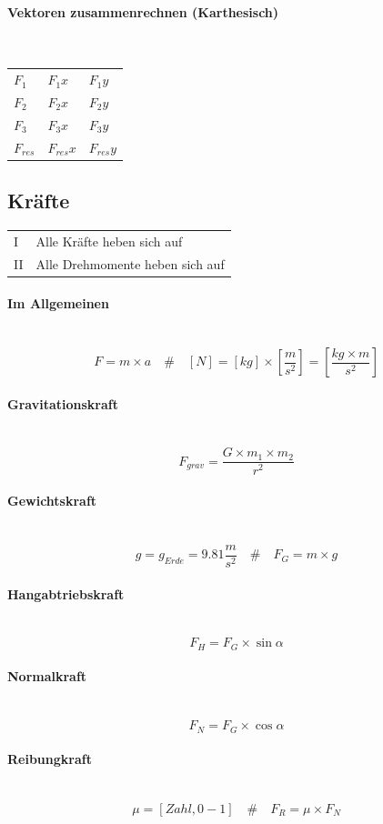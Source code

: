\documentclass[a4paper,10pt]{article}
\newcommand{\lbparagraph}[1]{\paragraph{#1}\mbox{}\\}
\newcommand{\eqsp}[1]{\quad\#\quad}
\begin{document}
\lbparagraph{Vektoren zusammenrechnen (Karthesisch)}

\begin{tabular}{l|l|l}		
  $F_1$ & $F_1x$ & $F_1y$ \\			
  $F_2$ & $F_2x$ & $F_2y$ \\			
  $F_3$ & $F_3x$ & $F_3y$ \\
  \hline
  $F_{res}$ & $F_{res}x$ & $F_{res}y$ \\
\end{tabular}

\subsection{Kräfte}

\begin{tabular}{l|l}
    I & Alle Kräfte heben sich auf \\
    II & Alle Drehmomente heben sich auf
\end{tabular}

\lbparagraph{Im Allgemeinen}

\begin{equation}
    F = m \times a
    \eqsp{}
    [N] = [kg] \times [\frac{m}{s^2}] = [\frac{kg \times m}{s^2}]
\end{equation}

\lbparagraph{Gravitationskraft}

\begin{equation}
    F_{grav} = \frac{G \times m_1 \times m_2}{r^2}
\end{equation}

\lbparagraph{Gewichtskraft}

\begin{equation}
    g = g_{Erde} = 9.81\frac{m}{s^2}
    \eqsp{}
    F_G = m \times g
\end{equation}

\lbparagraph{Hangabtriebskraft}

\begin{equation}
    F_H = F_G \times{\sin{\alpha}}
\end{equation}

\lbparagraph{Normalkraft}

\begin{equation}
    F_N = F_G \times \cos{\alpha}
\end{equation}

\lbparagraph{Reibungkraft}

\begin{equation}
    \mu = [Zahl, 0 - 1]
    \eqsp{}
    F_R = \mu \times F_N
\end{equation}
\end{document}

